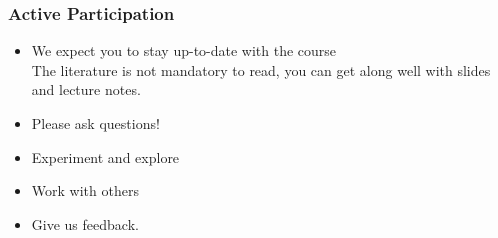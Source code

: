 \documentclass[handout,usepdftitle=false,aspectratio=169,smaller,compress,sans,fleqn,xcolor=dvipsnames,fleqn,table]{beamer}
\begin{document}
\begin{frame}%
  \frametitle{Active Participation}

  \medskip\begin{itemize}\itemsep=3ex
  \item We expect you to stay up-to-date with the course\\
The literature is not mandatory to read, you can get along well with
slides and lecture notes.
    \item Please ask questions!
    \item Experiment and explore
    \item Work with others
    \item Give us feedback.
    \end{itemize}
  \end{frame}
\end{document}
